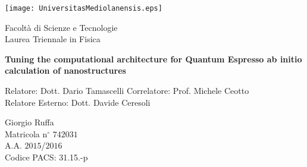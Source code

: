 {
\thispagestyle{empty}

\centerline{
\texttt{[image: UniversitasMediolanensis.eps]}
}

\begin{center}
{\Large Facolt\`a di Scienze e Tecnologie\\
\vskip0.2cm Laurea Triennale in Fisica }
\end{center}


\vskip1.5cm
\begin{center}
{\huge \textbf{Tuning the computational architecture for Quantum Espresso ab initio calculation of nanostructures}}
\end{center}

{\large
\vskip20mm Relatore:  Dott. Dario Tamascelli
\vskip 1mm Correlatore: Prof. Michele Ceotto\\
\vskip 1mm Relatore Esterno: Dott. Davide Ceresoli\\
}

\vskip2cm
\hskip9cm\parbox[t]{7cm}
{\large 
Giorgio Ruffa\\
Matricola n$^\circ$ $742031$\\
A.A. $2015$/$2016$\\
\vskip 0.5mm Codice PACS: 31.15.-p
}

\newpage
\newpage
\thispagestyle{empty}
\clearpage
}


